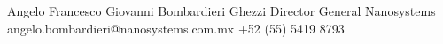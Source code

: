 
\begin{referees}
		{Angelo Francesco Giovanni Bombardieri Ghezzi}
		{Director General}
		{Nanosystems}
		{angelo.bombardieri@nanosystems.com.mx}
		{+52 (55) 5419 8793}
\end{referees}